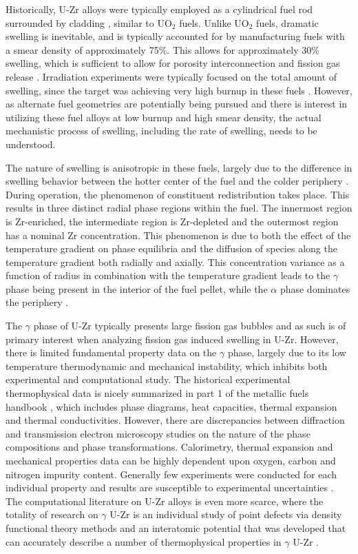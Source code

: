 \documentclass[review]{elsarticle}
\begin{document}
Historically, U-Zr alloys were typically employed as a cylindrical fuel rod surrounded by cladding \cite{ogata2012}, similar to UO$_{2}$ fuels. Unlike UO$_{2}$ fuels, dramatic swelling is inevitable, and is typically accounted for by manufacturing fuels with a smear density of approximately 75{\%}. This allows for approximately 30\% swelling, which is sufficient to allow for porosity interconnection and fission gas release \cite{beck1968}. Irradiation experiments were typically focused on the total amount of swelling, since the target was achieving very high burnup in these fuels \cite{hofman1997}. However, as alternate fuel geometries are potentially being pursued and there is interest in utilizing these fuel alloys at low burnup and high smear density, the actual mechanistic process of swelling, including the rate of swelling, needs to be understood. 

The nature of swelling is anisotropic in these fuels, largely due to the difference in swelling behavior between the hotter center of the fuel and the colder periphery \cite{hofman1990}. During operation, the phenomenon of constituent redistribution takes place. This results in three distinct radial phase regions within the fuel. The innermost region is Zr-enriched, the intermediate region is Zr-depleted and the outermost region has a nominal Zr concentration. This phenomenon is due to both the effect of the temperature gradient on phase equilibria and the diffusion of species along the temperature gradient both radially and axially. This concentration variance as a function of radius in combination with the temperature gradient leads to the $\gamma$ phase being present in the interior of the fuel pellet, while the $\alpha$ phase dominates the periphery \cite{kobayashi1990, kim2004}. 

The $\gamma$ phase of U-Zr typically presents large fission gas bubbles and as such is of primary interest when analyzing fission gas induced swelling in U-Zr. However, there is limited fundamental property data on the $\gamma$ phase, largely due to its low temperature thermodynamic and mechanical instability, which inhibits both experimental and computational study. The historical experimental thermophysical data is nicely summarized in part 1 of the metallic fuels handbook \cite{handbook1}, which includes phase diagrams, heat capacities, thermal expansion and thermal conductivities. However, there are discrepancies between diffraction and transmission electron microscopy studies on the nature of the phase compositions and phase transformations. Calorimetry, thermal expansion and mechanical properties data can be highly dependent upon oxygen, carbon and nitrogen impurity content. Generally few experiments were conducted for each individual property and results are susceptible to experimental uncertainties \cite{janney2018}. The computational literature on U-Zr alloys is even more scarce, where the totality of research on $\gamma$ U-Zr is an individual study of point defects via density functional theory methods \cite{beeler2010} and an interatomic potential that was developed that can accurately describe a number of thermophysical properties in $\gamma$ U-Zr \cite{moore2015}. 
\end{document}

